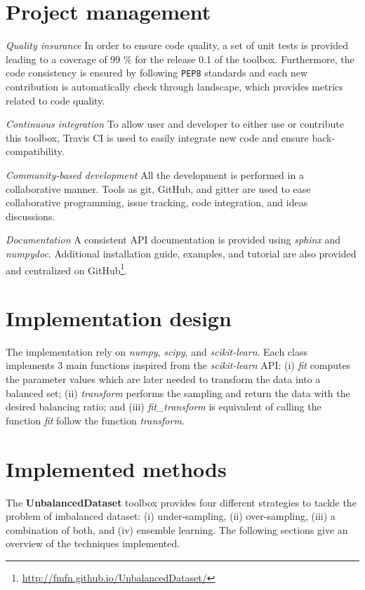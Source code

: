 \documentclass[twoside,11pt]{article}
\begin{document}
\section{Project management}

\noindent\textit{Quality insurance} In order to ensure code quality, a set of unit tests is provided leading to a coverage of 99 \% for the release 0.1 of the toolbox.
Furthermore, the code consistency is ensured by following \texttt{PEP8} standards and each new contribution is automatically check through landscape, which provides metrics related to code quality.

\noindent\textit{Continuous integration} To allow user and developer to either use or contribute this toolbox, Travis CI is used to easily integrate new code and ensure back-compatibility.

\noindent\textit{Community-based development} All the development is performed in a collaborative manner.
Tools as git, GitHub, and gitter are used to ease collaborative programming, issue tracking, code integration, and ideas discussions.

\noindent\textit{Documentation} A consistent API documentation is provided using \emph{sphinx} and \emph{numpydoc}.
Additional installation guide, examples, and tutorial are also provided and centralized on GitHub\footnote{\url{http://fmfn.github.io/UnbalancedDataset/}}.

\section{Implementation design}

The implementation rely on \emph{numpy}, \emph{scipy}, and \emph{scikit-learn}.
Each class implements 3 main functions inspired from the \emph{scikit-learn} API:
(i) \emph{fit} computes the parameter values which are later needed to transform the data into a balanced set;
(ii) \emph{transform} performs the sampling and return the data with the desired balancing ratio;
and (iii) \emph{fit\_transform} is equivalent of calling the function \emph{fit} follow the function \emph{transform}.

\section{Implemented methods}

The \textbf{UnbalancedDataset} toolbox provides four different strategies to tackle the problem of imbalanced dataset:
(i) under-sampling, (ii) over-sampling, (iii) a combination of both, and (iv) ensemble learning.
The following sections give an overview of the techniques implemented.
\end{document}
